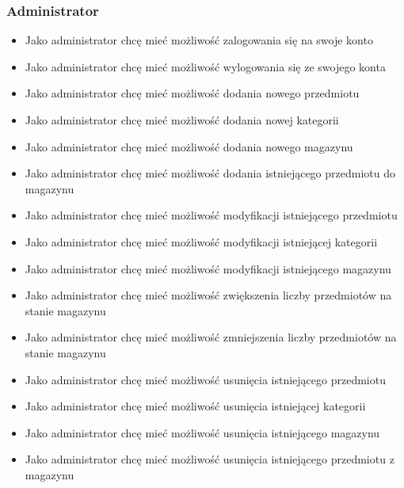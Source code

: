 \documentclass[../main.tex]{subfiles}
\begin{document}
        \subsubsection*{Administrator}
            \begin{itemize}
                \item Jako administrator chcę mieć możliwość zalogowania się na swoje konto
                \item Jako administrator chcę mieć możliwość wylogowania się ze swojego konta
                \item Jako administrator chcę mieć możliwość dodania nowego przedmiotu 
                \item Jako administrator chcę mieć możliwość dodania nowej kategorii
                \item Jako administrator chcę mieć możliwość dodania nowego magazynu
                \item Jako administrator chcę mieć możliwość dodania istniejącego przedmiotu do magazynu
                \item Jako administrator chcę mieć możliwość modyfikacji istniejącego przedmiotu 
                \item Jako administrator chcę mieć możliwość modyfikacji istniejącej kategorii
                \item Jako administrator chcę mieć możliwość modyfikacji istniejącego magazynu
                \item Jako administrator chcę mieć możliwość zwiększenia liczby przedmiotów na stanie magazynu
                \item Jako administrator chcę mieć możliwość zmniejszenia liczby przedmiotów na stanie magazynu
                \item Jako administrator chcę mieć możliwość usunięcia istniejącego przedmiotu 
                \item Jako administrator chcę mieć możliwość usunięcia istniejącej kategorii
                \item Jako administrator chcę mieć możliwość usunięcia istniejącego magazynu
                \item Jako administrator chcę mieć możliwość usunięcia istniejącego przedmiotu z magazynu
            \end{itemize}
        
\end{document}
